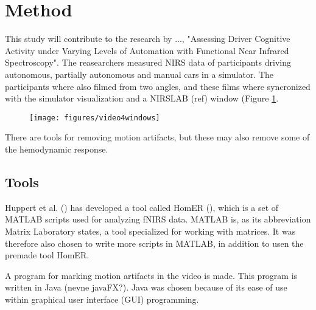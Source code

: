 \section{Method}





This study will contribute to the research by ..., "Assessing Driver Cognitive Activity under Varying Levels of Automation with Functional Near Infrared Spectroscopy". The reasearchers measured NIRS data of participants driving autonomous, partially autonomous and manual cars in a simulator. The participants where also filmed from two angles, and these films where syncronized with the simulator visualization and a NIRSLAB (ref) window (Figure \ref{video4windows}.

\begin{figure}
\texttt{[image: figures/video4windows]}
\label{video4windows}
\end{figure}

There are tools for removing motion artifacts, but these may also remove some of the hemodynamic response. 


\subsection{Tools}
Huppert et al. () has developed a tool called HomER (), which is a set of MATLAB scripts used for analyzing fNIRS data. MATLAB is, as its abbreviation Matrix Laboratory states, a tool specialized for working with matrices.  It was therefore also chosen to write more scripts in MATLAB, in addition to usen the premade tool HomER.

A program for marking motion artifacts in the video is made. This program is written in Java (nevne javaFX?). Java was chosen because of its ease of use within graphical user interface (GUI) programming. 

